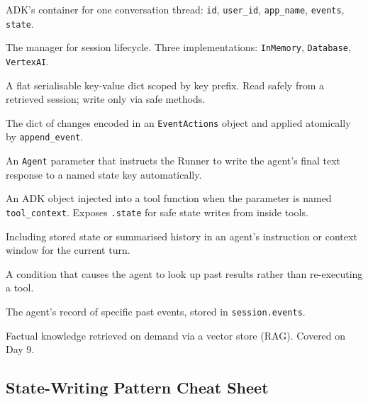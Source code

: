 \documentclass[12pt, a4paper]{article}
\begin{document}
\begin{description}[leftmargin=4.5cm, style=nextline, font=\bfseries\color{keyterm}]
  \item[Session] ADK's container for one conversation thread: \texttt{id},
    \texttt{user\_id}, \texttt{app\_name}, \texttt{events}, \texttt{state}.
  \item[SessionService] The manager for session lifecycle. Three implementations:
    \texttt{InMemory}, \texttt{Database}, \texttt{VertexAI}.
  \item[session.state] A flat serialisable key-value dict scoped by key prefix.
    Read safely from a retrieved session; write only via safe methods.
  \item[state\_delta] The dict of changes encoded in an \texttt{EventActions}
    object and applied atomically by \texttt{append\_event}.
  \item[output\_key] An \texttt{Agent} parameter that instructs the Runner to
    write the agent's final text response to a named state key automatically.
  \item[ToolContext] An ADK object injected into a tool function when the
    parameter is named \texttt{tool\_context}. Exposes \texttt{.state} for
    safe state writes from inside tools.
  \item[Memory injection] Including stored state or summarised history in an
    agent's instruction or context window for the current turn.
  \item[Retrieval trigger] A condition that causes the agent to look up past
    results rather than re-executing a tool.
  \item[Episodic memory] The agent's record of specific past events, stored in
    \texttt{session.events}.
  \item[Semantic memory] Factual knowledge retrieved on demand via a vector
    store (RAG). Covered on Day 9.
\end{description}

\subsection*{State-Writing Pattern Cheat Sheet}
\end{document}
